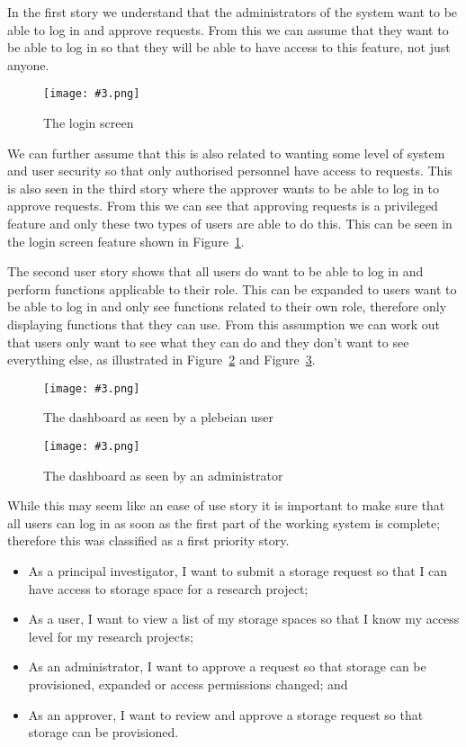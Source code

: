 \documentclass[a4paper,titlepage,12pt]{article}
\newcommand\figimg[4][\textwidth]{
	\begin{figure}
		\caption{#4}
		\label{fig:#2}
		\texttt{[image: \#3.png]}
	\end{figure}
}
\begin{document}
In the first story we understand that the administrators of the system want to
be able to log in and approve requests. From this we can assume that they want
to be able to log in so that they will be able to have access to this feature,
not just anyone.

\figimg{login}{login}{The login screen}

We can further assume that this is also related to wanting some level of system
and user security so that only authorised personnel have access to requests.
This is also seen in the third story where the approver wants to be able to log
in to approve requests. From this we can see that approving requests is a
privileged feature and only these two types of users are able to do this. This
can be seen in the login screen feature shown in Figure~\ref{fig:login}.

The second user story shows that all users do want to be able to log in and
perform functions applicable to their role. This can be expanded to users want
to be able to log in and only see functions related to their own role,
therefore only displaying functions that they can use. From this assumption we
can work out that users only want to see what they can do and they don't want
to see everything else, as illustrated in Figure~\ref{fig:user0} and
Figure~\ref{fig:user2}.

\figimg{user0}{user0}{The dashboard as seen by a plebeian user}

\figimg{user2}{user2}{The dashboard as seen by an administrator}

While this may seem like an ease of use story it is important to make sure that
all users can log in as soon as the first part of the working system is
complete; therefore this was classified as a first priority story.

\begin{itemize}
	\item As a principal investigator, I want to submit a storage request
	      so that I can have access to storage space for a research
	      project;
	\item As a user, I want to view a list of my storage spaces so that I
	      know my access level for my research projects;
	\item As an administrator, I want to approve a request so that storage
	      can be provisioned, expanded or access permissions changed; and
	\item As an approver, I want to review and approve a storage request so
	      that storage can be provisioned.
\end{itemize}
\end{document}

